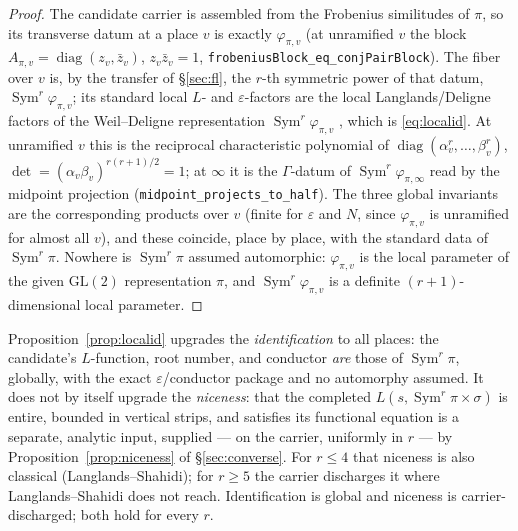 \documentclass[11pt]{article}
\theoremstyle{definition}
\newcommand{\Sym}{\operatorname{Sym}}
\begin{document}
\begin{proof}
The candidate carrier is assembled from the Frobenius similitudes of $\pi$, so its transverse datum at a
place $v$ is exactly $\varphi_{\pi,v}$ (at unramified $v$ the block $A_{\pi,v}=\operatorname{diag}(z_v,
\bar z_v)$, $z_v\bar z_v=1$, \texttt{frobeniusBlock\_eq\_conjPairBlock}). The fiber over $v$ is, by the
transfer of \S\ref{sec:fl}, the $r$-th symmetric power of that datum, $\Sym^r\varphi_{\pi,v}$; its
standard local $L$- and $\varepsilon$-factors are the local Langlands/Deligne factors of the
Weil--Deligne representation $\Sym^r\varphi_{\pi,v}$ \cite{Tate}, which is \eqref{eq:localid}. At
unramified $v$ this is the reciprocal characteristic polynomial of
$\operatorname{diag}(\alpha_v^{r},\dots,\beta_v^{r})$, $\det=(\alpha_v\beta_v)^{r(r+1)/2}=1$; at $\infty$
it is the $\Gamma$-datum of $\Sym^r\varphi_{\pi,\infty}$ read by the midpoint projection
(\texttt{midpoint\_projects\_to\_half}). The three global invariants are the corresponding products over
$v$ (finite for $\varepsilon$ and $N$, since $\varphi_{\pi,v}$ is unramified for almost all $v$), and
these coincide, place by place, with the standard data of $\Sym^r\pi$. Nowhere is $\Sym^r\pi$ assumed
automorphic: $\varphi_{\pi,v}$ is the local parameter of the given $\mathrm{GL}(2)$ representation $\pi$,
and $\Sym^r\varphi_{\pi,v}$ is a definite $(r{+}1)$-dimensional local parameter.
\end{proof}

Proposition~\ref{prop:localid} upgrades the \emph{identification} to all places: the candidate's
$L$-function, root number, and conductor \emph{are} those of $\Sym^r\pi$, globally, with the exact
$\varepsilon$/conductor package and no automorphy assumed. It does not by itself upgrade the \emph{niceness}: that
the completed $L(s,\Sym^r\pi\times\sigma)$ is entire, bounded in vertical strips, and satisfies its
functional equation is a separate, analytic input, supplied --- on the carrier, uniformly in $r$ --- by
Proposition~\ref{prop:niceness} of \S\ref{sec:converse}. For $r\le4$ that niceness is also classical
(Langlands--Shahidi); for $r\ge5$ the carrier discharges it where Langlands--Shahidi does not reach.
Identification is global and niceness is carrier-discharged; both hold for every $r$.
\end{document}
